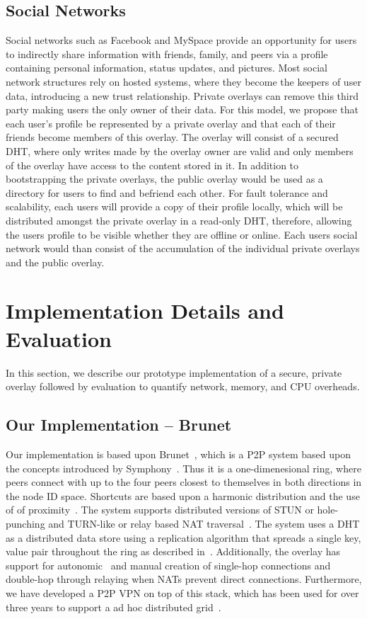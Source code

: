\documentclass[conference]{IEEEtran}
\begin{document}
\subsection{Social Networks}
Social networks such as Facebook and MySpace provide an opportunity for users to
indirectly share information with friends, family, and peers via a profile
containing personal information, status updates, and pictures.
Most social network structures rely on hosted systems, where they become
the keepers of user data, introducing a new trust relationship.  Private overlays
can remove this third party making users the only owner of their data.  For this
model, we propose that each user's profile be represented by a private overlay
and that each of their friends become members of this overlay.  The overlay will
consist of a secured DHT, where only writes made by the overlay owner are valid
and only members of the overlay have access to the content stored in it.  In
addition to bootstrapping the private overlays, the public overlay would be
used as a directory for users to find and befriend each other.  For fault
tolerance and scalability, each users will provide a copy of their profile
locally, which will be distributed amongst the private overlay in a read-only
DHT, therefore, allowing the users profile to be visible whether they are
offline or online.  Each users social network would than consist of the
accumulation of the individual private overlays and the public overlay.

\section{Implementation Details and Evaluation}
\label{evaluations}
In this section, we describe our prototype implementation of a secure, private
overlay followed by evaluation to quantify network, memory, and CPU overheads.

\subsection{Our Implementation -- Brunet}
Our implementation is based upon Brunet~\cite{brunet}, which is a P2P system
based upon the concepts introduced by Symphony~\cite{symphony}.  Thus it is a
one-dimenesional ring, where peers connect with up to the four peers closest
to themselves in both directions in the node ID space.  Shortcuts are based
upon a harmonic distribution and the use of of proximity~\cite{hpdc08_0}.  The
system supports distributed versions of STUN or hole-punching and TURN-like or
relay based NAT traversal~\cite{nsdi10}.  The system uses a DHT as a distributed
data store using a replication algorithm that spreads a single key, value pair
throughout the ring as described in~\cite{pcgrid07}.  Additionally, the overlay
has support for autonomic~\cite{wow} and manual creation of single-hop
connections and double-hop through relaying when NATs prevent direct
connections.  Furthermore, we have developed a P2P VPN on top of this stack,
which has been used for over three years to support a ad hoc distributed
grid~\cite{archer, gridappliance}.
\end{document}
